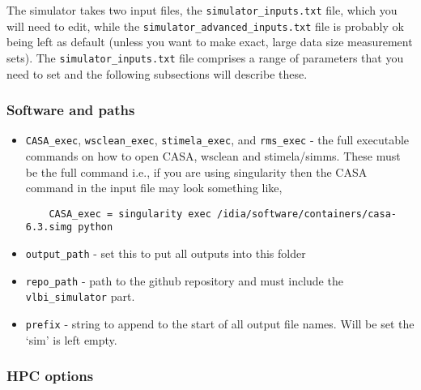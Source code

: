 \documentclass[11pt]{report_jfr}
\begin{document}
The simulator takes two input files, the \texttt{simulator\_inputs.txt} file, which you will need to edit, while the \texttt{simulator\_advanced\_inputs.txt} file is probably ok being left as default (unless you want to make exact, large data size measurement sets). The \texttt{simulator\_inputs.txt} file comprises a range of parameters that you need to set and the following subsections will describe these.

\subsubsection{Software and paths}
\begin{itemize}
	\item \texttt{CASA\_exec}, \texttt{wsclean\_exec}, \texttt{stimela\_exec}, and \texttt{rms\_exec} - the full executable commands on how to open CASA, wsclean and stimela/simms. These must be the full command i.e., if you are using singularity then the CASA command in the input file may look something like,
	\begin{lstlisting}
	CASA_exec = singularity exec /idia/software/containers/casa-6.3.simg python
	\end{lstlisting}
	\item \texttt{output\_path} - set this to put all outputs into this folder
	\item \texttt{repo\_path} - path to the github repository and must include the \texttt{vlbi\_simulator} part.
	\item \texttt{prefix} - string to append to the start of all output file names. Will be set the `sim' is left empty.
\end{itemize}

\subsubsection{HPC options}
\end{document}
